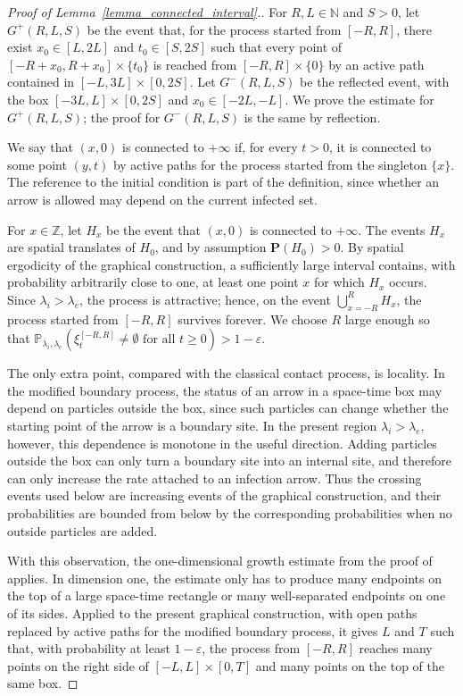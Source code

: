 \documentclass[11pt,a4paper]{article}
\theoremstyle{plain}
\theoremstyle{definition}
\theoremstyle{remark}
\numberwithin{equation}{section}
\begin{document}
	\begin{proof}[Proof of Lemma~\ref{lemma_connected_interval}.]
		For $R,L\in\mathbb{N}$ and $S>0$, let $G^+(R,L,S)$ be the event that, for the process started from $[-R,R]$, there exist $x_0\in[L,2L]$ and $t_0\in[S,2S]$ such that every point of $[-R+x_0,R+x_0]\times\{t_0\}$ is reached from $[-R,R]\times\{0\}$ by an active path contained in $[-L,3L]\times[0,2S]$. Let $G^-(R,L,S)$ be the reflected event, with the box $[-3L,L]\times[0,2S]$ and $x_0\in[-2L,-L]$. We prove the estimate for $G^+(R,L,S)$; the proof for $G^-(R,L,S)$ is the same by reflection.
		
		We say that $(x,0)$ is connected to $+\infty$ if, for every $t>0$, it is connected to some point $(y,t)$ by active paths for the process started from the singleton $\{x\}$. The reference to the initial condition is part of the definition, since whether an arrow is allowed may depend on the current infected set.
		
		For $x\in\mathbb{Z}$, let $H_x$ be the event that $(x,0)$ is connected to $+\infty$. The events $H_x$ are spatial translates of $H_0$, and by assumption $\mathbf{P}(H_0)>0$. By spatial ergodicity of the graphical construction, a sufficiently large interval contains, with probability arbitrarily close to one, at least one point $x$ for which $H_x$ occurs. Since $\lambda_i>\lambda_e$, the process is attractive; hence, on the event $\bigcup_{x=-R}^R H_x$, the process started from $[-R,R]$ survives forever. We choose $R$ large enough so that $\mathbb{P}_{\lambda_i,\lambda_e}(\xi^{[-R,R]}_t\neq\emptyset \text{ for all }t\geq0)>1-\varepsilon$.
		
		The only extra point, compared with the classical contact process, is
		locality.  In the modified boundary process, the status of an arrow in a
		space-time box may depend on particles outside the box, since such
		particles can change whether the starting point of the arrow is a
		boundary site.  In the present region $\lambda_i>\lambda_e$, however,
		this dependence is monotone in the useful direction.  Adding particles
		outside the box can only turn a boundary site into an internal site, and
		therefore can only increase the rate attached to an infection arrow.
		Thus the crossing events used below are increasing events of the
		graphical construction, and their probabilities are bounded from below
		by the corresponding probabilities when no outside particles are added.
		
		With this observation, the one-dimensional growth estimate from the proof of~\cite[Lemma 7]{BG90} applies. In dimension one, the estimate only has to produce many endpoints on the top of a large space-time rectangle or many well-separated endpoints on one of its sides. Applied to the present graphical construction, with open paths replaced by active paths for the modified boundary process, it gives $L$ and $T$ such that, with probability at least $1-\varepsilon$, the process from $[-R,R]$ reaches many points on the right side of $[-L,L]\times[0,T]$ and many points on the top of the same box.
		

\end{proof}
\end{document}
